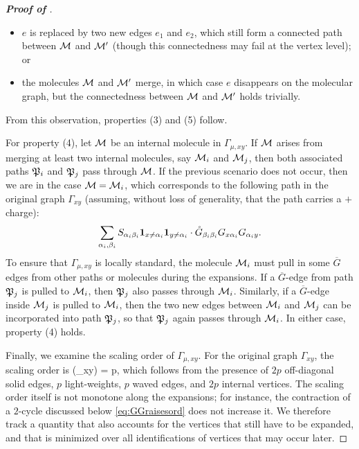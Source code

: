 \begin{proof}[\bf Proof of ]
\begin{itemize}
\item $e$ is replaced by two new edges $e_1$ and $e_2$, which still form a connected path between $\mathcal{M}$ and $\mathcal{M}'$ (though this connectedness may fail at the vertex level); or %
 

\item the molecules $\mathcal{M}$ and $\mathcal{M}'$ merge, in which case $e$ disappears on the molecular graph, but the connectedness between $\mathcal{M}$ and $\mathcal{M}'$ holds trivially. 

\end{itemize}
From this observation, properties (3) and (5) follow.

For property (4), let $\mathcal{M}$ be an internal molecule in $\Gamma_{\mu,xy}$. If $\mathcal{M}$ arises from merging at least two internal molecules, say $\mathcal{M}_i$ and $\mathcal{M}_j$, then both associated paths $\mathfrak{P}_i$ and $\mathfrak{P}_j$ pass through $\mathcal{M}$.
If the previous scenario does not occur, then we are in the case $\mathcal{M}=\mathcal{M}_i$, which corresponds to the following path in the original graph $\Gamma_{xy}$ (assuming, without loss of generality, that the path carries a $+$ charge):
\[ \sum_{\alpha_i,\beta_i}S_{\alpha_i\beta_i} \mathbf 1_{x\ne \alpha_i}\mathbf 1_{y\ne \alpha_i}\cdot {\mathring G}_{\beta_i\beta_i} G_{x\alpha_i}G_{\alpha_i y}.\] 
To ensure that $\Gamma_{\mu,xy}$ is locally standard, the molecule $\mathcal{M}_i$ must pull in some $\overline G$ edges from other paths or molecules during the expansions. 
If a $\overline G$-edge from path $\mathfrak{P}_j$ is pulled to $\mathcal{M}_i$, then $\mathfrak{P}_j$ also passes through $\mathcal{M}_i$. Similarly, if a $\overline G$-edge inside $\mathcal{M}_j$ is pulled to $\mathcal{M}_i$, then the two new edges between $\mathcal{M}_i$ and $\mathcal{M}_j$ can be incorporated into path $\mathfrak{P}_j$, so that $\mathfrak{P}_j$ again passes through $\mathcal{M}_i$. In either case, property (4) holds.


Finally, we examine the scaling order of $\Gamma_{\mu,xy}$. For the original graph $\Gamma_{xy}$, the scaling order is
\be\label{eq:initial_scaling} \ord(\Gamma_{xy}) =
p, \ee
which follows from the presence of $2p$ off-diagonal solid edges, $p$ light-weights, $p$ waved edges, and $2p$ internal vertices. The scaling order itself is not monotone along the expansions; for instance, the contraction of a $2$-cycle discussed below \eqref{eq:GGraisesord} does not increase it. We therefore track a quantity that also accounts for the vertices that still have to be expanded, and that is minimized over all identifications of vertices that may occur later.


\end{proof}
